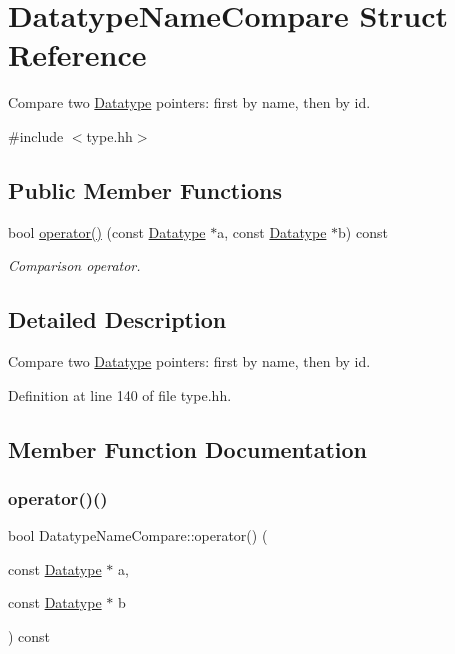 \hypertarget{struct_datatype_name_compare}{}\section{Datatype\+Name\+Compare Struct Reference}
\label{struct_datatype_name_compare}


Compare two \mbox{\hyperlink{class_datatype}{Datatype}} pointers\+: first by name, then by id.  




{\ttfamily \#include $<$type.\+hh$>$}

\subsection*{Public Member Functions}
\begin{DoxyCompactItemize}
\item 
bool \mbox{\hyperlink{struct_datatype_name_compare_a07af5044274609520e6ad8bae096671c}{operator()}} (const \mbox{\hyperlink{class_datatype}{Datatype}} $\ast$a, const \mbox{\hyperlink{class_datatype}{Datatype}} $\ast$b) const
\begin{DoxyCompactList}\small\item\em Comparison operator. \end{DoxyCompactList}\end{DoxyCompactItemize}


\subsection{Detailed Description}
Compare two \mbox{\hyperlink{class_datatype}{Datatype}} pointers\+: first by name, then by id. 

Definition at line 140 of file type.\+hh.



\subsection{Member Function Documentation}
\mbox{\label{struct_datatype_name_compare_a07af5044274609520e6ad8bae096671c}} 
\subsubsection{\texorpdfstring{operator()()}{operator()()}}
{\footnotesize\ttfamily bool Datatype\+Name\+Compare\+::operator() (\begin{DoxyParamCaption}\item[{const \mbox{\hyperlink{class_datatype}{Datatype}} $\ast$}]{a,  }\item[{const \mbox{\hyperlink{class_datatype}{Datatype}} $\ast$}]{b }\end{DoxyParamCaption}) const\hspace{0.3cm}{\ttfamily [inline]}}



